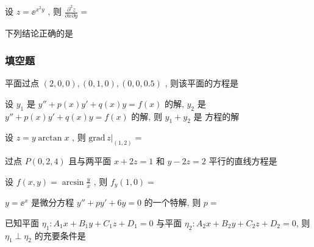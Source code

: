 \begin{ti}
	设 $z=\ee^{x^2y}$ , 则 $\frac{\partial^2z}{\partial x\partial y}=$\kuoC
\end{ti}

\begin{ti}
	下列结论正确的是\kuoA
\end{ti}


\subsubsection{填空题}
\begin{ti}
	平面过点 $(2,0,0),(0,1,0),(0,0,0.5)$ , 则该平面的方程是 
\end{ti}

\begin{ti}
	设 $y_1$ 是 $y''+p(x)y'+q(x)y=f(x)$ 的解, $y_2$ 是 $y''+p(x)y'+q(x)y=f(x)$ 的解, 则 $y_1+y_2$ 是   方程的解
\end{ti}

\begin{ti}
	设 $z=y\arctan x$ , 则 $\left.\mathrm{grad}\,z\right|_{(1,2)}=$ 
\end{ti}

\begin{ti}
	过点 $P(0,2,4)$ 且与两平面 $x+2z=1$ 和 $y-2z=2$ 平行的直线方程是 
\end{ti}

\begin{ti}
	设 $f(x,y)=\arcsin\frac{y}{x}$ , 则 $f_y(1,0)=$ 
\end{ti}

\begin{ti}
	$y=\ee^x$ 是微分方程 $y''+py'+6y=0$ 的一个特解, 则 $p=$ 
\end{ti}

\begin{ti}
	已知平面 $\eta_1:A_1x+B_1y+C_1z+D_1=0$ 与平面 $\eta_2:A_2x+B_2y+C_2z+D_2=0$, 则 $\eta_1\perp\eta_2$ 的充要条件是 
\end{ti}

